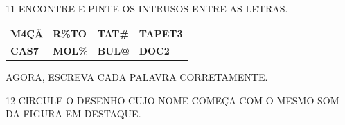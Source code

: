 




\num{11} ENCONTRE E PINTE OS INTRUSOS ENTRE AS LETRAS.

\begin{longtable}[]{@{}llll@{}}
\toprule
\textbf{M4ÇÃ} & \textbf{R\%TO} & \textbf{TAT\#} &
\textbf{TAPET3}\tabularnewline
\textbf{CAS7} & \textbf{MOL\%} & \textbf{BUL@} &
\textbf{DOC2}\tabularnewline
\bottomrule
\end{longtable}

AGORA, ESCREVA CADA PALAVRA CORRETAMENTE.


\num{12} CIRCULE O DESENHO CUJO NOME COMEÇA COM O MESMO SOM DA FIGURA EM DESTAQUE.

